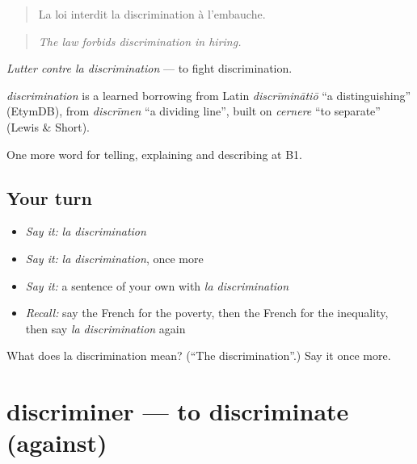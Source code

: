 \begin{quote}
La loi interdit la discrimination à l'embauche.
\end{quote}

\begin{quote}
\emph{The law forbids discrimination in hiring.}
\end{quote}

\emph{Lutter contre la discrimination} — to fight discrimination.

\begin{cousinweb}
\emph{discrimination} is a learned borrowing from Latin \emph{discrīminātiō} \textquotedblleft{}a distinguishing\textquotedblright{} (EtymDB), from \emph{discrīmen} \textquotedblleft{}a dividing line\textquotedblright{}, built on \emph{cernere} \textquotedblleft{}to separate\textquotedblright{} (Lewis \& Short).
\end{cousinweb}

\begin{grammarlens}[title={What you've built}]
One more word for telling, explaining and describing at B1.
\end{grammarlens}

\subsection*{Your turn}
\begin{itemize}
\raggedright
  \item \emph{Say it:} \emph{la discrimination}
  \item \emph{Say it:} \emph{la discrimination}, once more
  \item \emph{Say it:} a sentence of your own with \emph{la discrimination}
  \item \emph{Recall:} say the French for the poverty, then the French for the inequality, then say \emph{la discrimination} again
\end{itemize}

\begin{tcolorbox}[breakable,colback=teal!4,colframe=teal!35!black,title={Before you move on}]
What does la discrimination mean? (\textquotedblleft{}The discrimination\textquotedblright{}.) Say it once more.
\end{tcolorbox}
\section[discriminer]{discriminer — to discriminate (against)}

